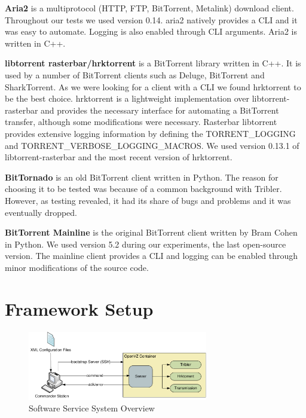 \textbf{Aria2} is a multiprotocol (HTTP, FTP, BitTorrent, Metalink) download
client. Throughout our tests we used version 0.14. aria2 natively provides a
CLI and it was easy to automate. Logging is also enabled through CLI
arguments. Aria2 is written in C++.

\textbf{libtorrent rasterbar/hrktorrent} is a BitTorrent library written in
C++. It is used by a number of BitTorrent clients such as Deluge, BitTorrent
and SharkTorrent. As we were looking for a client with a CLI we found
hrktorrent to be the best choice. hrktorrent is a lightweight implementation
over libtorrent-rasterbar and provides the necessary interface for automating
a BitTorrent transfer, although some modifications were necessary. Rasterbar
libtorrent provides extensive logging information by defining the
TORRENT\_LOGGING and TORRENT\_VERBOSE\_LOGGING\_MACROS. We used version 0.13.1
of libtorrent-rasterbar and the most recent version of hrktorrent.

\textbf{BitTornado} is an old BitTorrent client written in Python. The reason
for choosing it to be tested was because of a common background with Tribler.
However, as testing revealed, it had its share of bugs and problems and it was
eventually dropped.

\textbf{BitTorrent Mainline} is the original BitTorrent client written by Bram
Cohen in Python. We used version 5.2 during our experiments, the last
open-source version. The mainline client provides a CLI and logging can be
enabled through minor modifications of the source code.

\section{Framework Setup}
\label{sec:deploy-fwork}

\begin{figure}[h]
  \begin{center}
    \includegraphics[width=0.7\textwidth]{src/img/virt-infra/service-arch}
  \end{center}
  \caption{Software Service System Overview}
  \label{fig:virt-infra:service-arch}
\end{figure}

